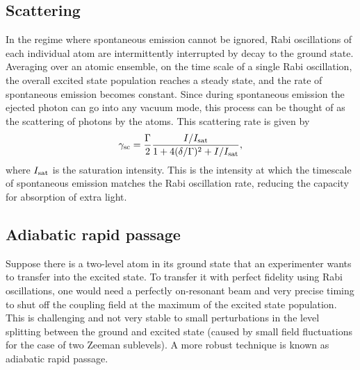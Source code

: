 \subsection{Scattering}\label{sec:scattering}
In the regime where spontaneous emission cannot be ignored, Rabi oscillations of each individual atom are intermittently interrupted by decay to the ground state. Averaging over an atomic ensemble, on the time scale of a single Rabi oscillation, the overall excited state population reaches a steady state, and the rate of spontaneous emission becomes constant. Since during spontaneous emission the ejected photon can go into any vacuum mode, this process can be thought of as the scattering of photons by the atoms. This scattering rate is given by\cite{LCT}
\begin{equation}
\gamma_{\rm{sc}}= \frac{\Gamma}{2} \frac{I/I_{\rm{sat}}}{1+4(\delta/\Gamma)^2 +I/I_{\rm{sat}}},
\label{eq:scatrate}
\end{equation}
where $I_{\rm{sat}}$ is the saturation intensity. This is the intensity at which the timescale of spontaneous emission matches the Rabi oscillation rate, reducing the capacity for absorption of extra light.   

\subsection{Adiabatic rapid passage}\label{sec:ARP}

Suppose there is a two-level atom in its ground state that an experimenter wants to transfer into the excited state. To transfer it with perfect fidelity using Rabi oscillations, one would need a perfectly on-resonant beam and very precise timing to shut off the coupling field at the maximum of the excited state population. This is challenging and not very stable to small perturbations in the level splitting between the ground and excited state (caused by small field fluctuations for the case of two Zeeman sublevels). A more robust technique is known as adiabatic rapid passage. 

